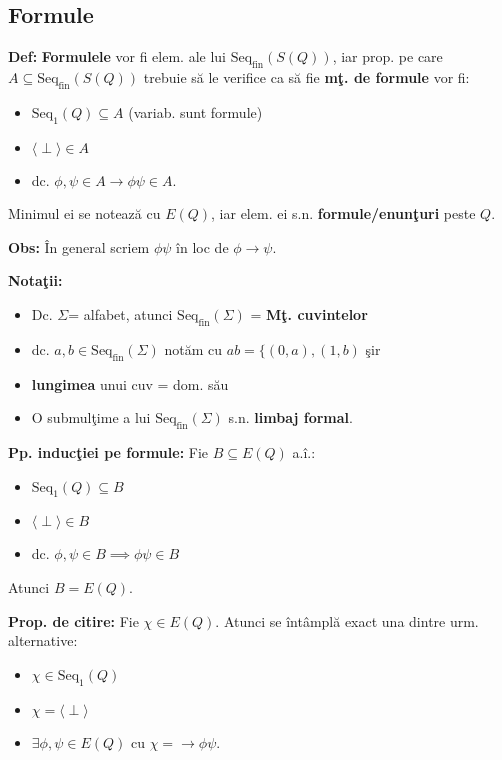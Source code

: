 \documentclass{article}
\begin{document}
\subsection{Formule}

\textbf{Def:} \textbf{Formulele} vor fi elem. ale lui $\text{Seq}_\text{fin}(S(Q))$, iar prop. pe care $A\subseteq \text{Seq}_\text{fin}(S(Q))$ trebuie s\u a le verifice ca s\u a fie \textbf{m\c t. de formule} vor fi:
\begin{itemize}
    \item $\text{Seq}_1(Q)\subseteq A$ (variab. sunt formule)
    \item $\langle \perp \rangle \in A$
    \item dc. $\phi,\psi \in A \rightarrow \phi\psi\in A$.
\end{itemize}
Minimul ei se noteaz\u a cu \textbf{$E(Q)$}, iar elem. ei s.n. \textbf{formule/enun\c turi} peste $Q$.

\textbf{Obs:} \^ In general scriem $\phi\psi$ \^ in loc de $\phi \rightarrow \psi$.

\textbf{Nota\c tii:}
\begin{itemize}
    \item Dc. $\Sigma$= alfabet, atunci $\text{Seq}_\text{fin}(\Sigma)$ = \textbf{M\c t. cuvintelor}
    \item dc. $a,b \in \text{Seq}_\text{fin}(\Sigma)$ not\u am cu $ab=\{(0,a),(1,b)$ \c sir
    \item \textbf{lungimea} unui cuv = dom. s\u au
    \item O submul\c time a lui $\text{Seq}_\text{fin}(\Sigma)$ s.n. \textbf{limbaj formal}.
\end{itemize}

\textbf{Pp. induc\c tiei pe formule:} Fie $B\subseteq E(Q)$ a.\^ i.:
\begin{itemize}
    \item $\text{Seq}_1(Q)\subseteq B$
    \item $\langle \perp\rangle \in B$
    \item dc. $\phi,\psi \in B\implies\phi\psi\in B$
\end{itemize}
Atunci $B=E(Q)$.

\textbf{Prop. de citire:} Fie $\chi\in E(Q).$ Atunci se \^ int\^ ampl\u a exact una dintre urm. alternative:
\begin{itemize}
    \item $\chi \in \text{Seq}_1(Q)$
    \item  $\chi=\langle\perp\rangle$
    \item $\exists \phi,\psi \in E(Q)$ cu $\chi=\rightarrow \phi\psi$.
\end{itemize}
\end{document}
